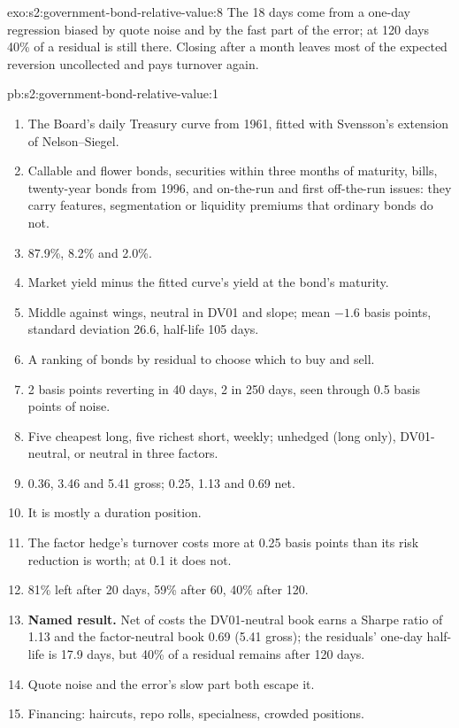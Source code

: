 \begin{solution}{exo:s2:government-bond-relative-value:8}
The 18 days come from a one-day regression biased by quote noise and by the fast part of the error; at 120 days 40\% of a residual is still there.
Closing after a month leaves most of the expected reversion uncollected and pays turnover again.
\end{solution}

\begin{solution}{pb:s2:government-bond-relative-value:1}
\begin{enumerate}
\item The Board's daily Treasury curve from 1961, fitted with Svensson's extension of Nelson--Siegel.
\item Callable and flower bonds, securities within three months of maturity, bills, twenty-year bonds from 1996, and on-the-run and first
off-the-run issues: they carry features, segmentation or liquidity premiums that ordinary bonds do not.
\item 87.9\%, 8.2\% and 2.0\%.
\item Market yield minus the fitted curve's yield at the bond's maturity.
\item Middle against wings, neutral in DV01 and slope; mean $-1.6$ basis points, standard deviation 26.6, half-life 105 days.
\item A ranking of bonds by residual to choose which to buy and sell.
\item 2 basis points reverting in 40 days, 2 in 250 days, seen through 0.5 basis points of noise.
\item Five cheapest long, five richest short, weekly; unhedged (long only), DV01-neutral, or neutral in three factors.
\item 0.36, 3.46 and 5.41 gross; 0.25, 1.13 and 0.69 net.
\item It is mostly a duration position.
\item The factor hedge's turnover costs more at 0.25 basis points than its risk reduction is worth; at 0.1 it does not.
\item 81\% left after 20 days, 59\% after 60, 40\% after 120.
\item \textbf{Named result.} Net of costs the DV01-neutral book earns a Sharpe ratio of 1.13 and the factor-neutral book 0.69 (5.41 gross); the
residuals' one-day half-life is 17.9 days, but 40\% of a residual remains after 120 days.
\item Quote noise and the error's slow part both escape it.
\item Financing: haircuts, repo rolls, specialness, crowded positions.

\end{enumerate}
\end{solution}
